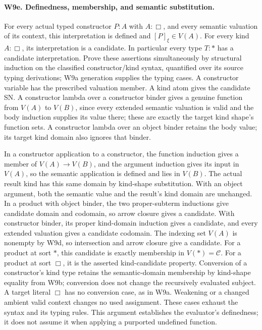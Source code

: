 \paragraph{W9e. Definedness, membership, and semantic substitution.}
For every actual typed constructor \(P:A\) with \(A:\Box\), and
every semantic valuation of its context, this interpretation is defined
and \([P]_\xi\in V(A)\). For every kind \(A:\Box\), its
interpretation is a candidate. In particular every type \(T:\ast\)
has a candidate interpretation. Prove these assertions simultaneously
by structural induction on the classified constructor/kind syntax,
quantified over its source typing derivations; W9a generation supplies
the typing cases. A constructor variable has the prescribed valuation
member. A kind atom gives the candidate SN. A constructor lambda over
a constructor binder gives a genuine function from \(V(A)\) to
\(V(B)\), since every extended semantic valuation is valid and the
body induction supplies its value there; these are exactly the target
kind shape's function sets. A constructor lambda over an object binder
retains the body value; its target kind domain also ignores that binder.

In a constructor application to a constructor, the function induction
gives a member of \(V(A)\to V(B)\), and the argument induction
gives its input in \(V(A)\), so the semantic application is defined
and lies in \(V(B)\). The actual result kind has this same domain by
kind-shape substitution. With an object argument, both the semantic
value and the result's kind domain are unchanged. In a product with
object binder, the two proper-subterm inductions give candidate domain
and codomain, so arrow closure gives a candidate. With constructor
binder, its proper kind-domain induction gives a candidate, and every
extended valuation gives a candidate codomain. The indexing set \(V(A)\)
is nonempty by W9d, so intersection and arrow closure give a candidate.
For a product at sort \(\ast\), this candidate is exactly membership
in \(V(\ast)=\mathcal C\). For a product at sort \(\Box\), it
is the asserted kind-candidate property. Conversion of a constructor's
kind type retains the semantic-domain membership by kind-shape equality
from W9b; conversion does not change the recursively evaluated subject.
A target literal \(\Box\) has no conversion case, as in W9a.
Weakening or a changed ambient valid context changes no used assignment.
These cases exhaust the syntax and its typing rules. This argument
establishes the evaluator's definedness; it does not assume it when
applying a purported undefined function.

